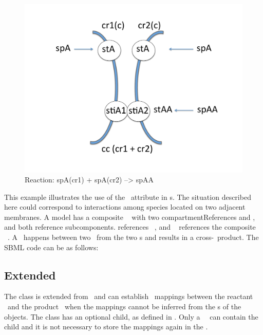 \begin{figure}[htb]
  \includegraphics[scale=0.25]{./figs/example_extendedSimpleSpeciesReference_ppt}
  \caption{Reaction: spA(cr1) + spA(cr2) --> spAA}
  \label{fig:Example:extendedSimpleSpeciesReference}
\end{figure}

This example illustrates the use of the \compartmentReferenceAtt\ attribute in \simpleSpeciesReference s. The situation described here could correspond to interactions among species located on two adjacent membranes. A model has a composite \compartment\  with two compartmentReferences  and , and both reference  subcomponents.   references \compartment\ , and \species\  references the composite \compartment\ . A \reaction\ happens between two  \species\ from the two  \compartment s and results in a cross-\compartment\ product. The SBML code can be as follows:


\clearpage

\subsection{Extended }
\label{def:ExSpeciesReference}

The \SpeciesReference class is extended from \SbmlLevelThreeCore\ and can establish \component\ mappings between the reactant \species\ and the product \species\ when the mappings cannot be inferred from the \idAtt s of the \SpeciesTypeInstance objects. The \SpeciesReference class has an optional \ListOfSpeciesTypeComponentMapsInProduct child, as defined in . Only a \reaction\ \product\ can contain the \ListOfSpeciesTypeComponentMapsInProduct child and it is not necessary to store the mappings again in the \reactants.

